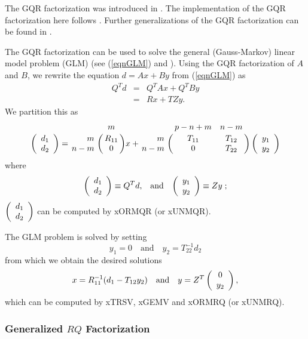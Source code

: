 The GQR factorization was introduced in \cite{hammarling86,paige90}.
The implementation of the GQR factorization here follows \cite{lawn31}.
Further generalizations of the GQR factorization can be found in
\cite{demoorvandooren92}.

The GQR factorization can be used to solve the general (Gauss-Markov) linear
model problem (GLM) (see (\ref{eqnGLM}) and
\cite{paige79}\cite[page 252]{GVL2}).
Using the GQR factorization of $A$ and $B$, we rewrite the equation
$d = A x + B y$ from (\ref{eqnGLM}) as
\begin{eqnarray*}
Q^T d & = & Q^T A x + Q^T B y \\
      & = & R x + T Z y.
\end{eqnarray*}
We partition this as
\[
\bmat{c}
   d_1 \\
   d_2
   \emat =
\bordermatrix{    &  m  \cr
       \hfill  m  & R_{11}   \cr
               n-m & 0     } x +
\bordermatrix{      & p-n+m  & n-m   \cr
       \hfill  m    & T_{11} & T_{12}   \cr
               n-m  &   0    & T_{22}   } \bmat{c}
                                            y_1 \\
                                            y_2 \\
                                            \emat
\]
where
\[
\bmat{c}
            d_1  \\
            d_2 \\
            \emat \equiv Q^T d, \; \; \; {\rm and} \; \; \;
\bmat{c}
            y_1  \\
            y_2 \\
            \emat  \equiv Z y \; ;
\]
$\bmat{c} d_1 \\  d_2 \emat$ can be computed by xORMQR (or xUNMQR).

The GLM problem is solved by setting
\[
y_1 = 0 \quad \mbox{and} \quad y_2 = T^{-1}_{22} d_2
\]
from which we obtain the desired solutions
\[
x = R^{-1}_{11}(d_1 - T_{12} y_2) \quad \mbox{and} \quad
y = Z^T \bmat{c}
            0  \\
            y_2 \\
            \emat,
\]
which can be computed by xTRSV, xGEMV and xORMRQ (or xUNMRQ).

\subsubsection{Generalized $RQ$ Factorization}

